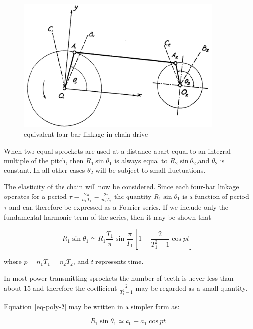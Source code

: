 \begin{figure}[th!]
  \centering
  \includegraphics[width=0.9\textwidth]{A2_polygonal_action/fig1.png}
  \caption{equivalent four-bar linkage in chain drive}
  \label{fig-poly-1}
\end{figure}

When two equal sprockets are used at a distance apart equal to an integral multiple of the pitch, then $R_1\sin\theta_1$ is always equal to $R_2\sin\theta_2$,and $\dot{\theta}_2$ is constant. In all other cases $\dot{\theta}_2$ will be subject to small fluctuations.

The elasticity of the chain will now be considered. Since each four-bar linkage operates for a period $\tau=\frac{2\pi}{n_1T_1}=\frac{2\pi}{n_2T_2}$ the quantity $R_1\sin\theta_1$ is a function of period $\tau$ and can therefore be expressed as a Fourier series. If we include only the fundamental harmonic term of the series, then it may be shown that

\begin{equation}
    R_1\sin\theta_1 \simeq R_1\frac{T_1}{\pi}\sin\frac{\pi}{T_1}\left[1-\frac{2}{T_1^2-1}\cos pt\right]
    \label{eq-poly-2}
\end{equation}

where $p=n_1T_1=n_2T_2$, and $t$ represents time.

In most power transmitting sprockets the number of teeth is never less than about 15 and therefore the coefficient $\frac{2}{T_1^2-1}$ may be regarded as a small quantity.

Equation~\ref{eq-poly-2} may be written in a simpler form as:

\begin{equation}
  R_1\sin\theta_1 \simeq a_0 + a_1\cos pt
\end{equation}

